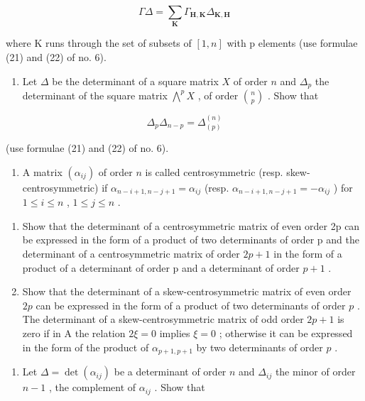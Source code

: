 \[
\Gamma \Delta = \sum_ {\mathbf {K}} \Gamma_ {\mathbf {H}, \mathbf {K}} \Delta_ {\mathbf {K}, \mathbf {H}}
\]

where K runs through the set of subsets of \([1, n]\) with p elements (use formulae (21) and (22) of no. 6).

\begin{enumerate}
\def\labelenumi{\arabic{enumi}.}
\setcounter{enumi}{10}
\tightlist
\item
  Let \(\Delta\) be the determinant of a square matrix \(X\) of order \(n\) and \(\Delta_p\) the determinant of the square matrix \(\bigwedge^p X\) , of order \(\binom{n}{p}\) . Show that
\end{enumerate}

\[
\Delta_ {p} \Delta_ {n - p} = \Delta_ {(p)} ^ {(n)}
\]

(use formulae (21) and (22) of no. 6).

\begin{enumerate}
\def\labelenumi{\arabic{enumi}.}
\setcounter{enumi}{11}
\tightlist
\item
  A matrix \((\alpha_{ij})\) of order \(n\) is called centrosymmetric (resp. skew-centrosymmetric) if \(\alpha_{n - i + 1, n - j + 1} = \alpha_{ij}\) (resp. \(\alpha_{n - i + 1, n - j + 1} = -\alpha_{ij}\) ) for \(1 \leqslant i \leqslant n\) , \(1 \leqslant j \leqslant n\) .
\end{enumerate}

\begin{enumerate}
\def\labelenumi{(\alph{enumi})}
\item
  Show that the determinant of a centrosymmetric matrix of even order 2p can be expressed in the form of a product of two determinants of order p and the determinant of a centrosymmetric matrix of order \(2p + 1\) in the form of a product of a determinant of order p and a determinant of order \(p + 1\) .
\item
  Show that the determinant of a skew-centrosymmetric matrix of even order \(2p\) can be expressed in the form of a product of two determinants of order \(p\) . The determinant of a skew-centrosymmetric matrix of odd order \(2p + 1\) is zero if in A the relation \(2\xi = 0\) implies \(\xi = 0\) ; otherwise it can be expressed in the form of the product of \(\alpha_{p+1,p+1}\) by two determinants of order \(p\) .
\end{enumerate}

\begin{enumerate}
\def\labelenumi{\arabic{enumi}.}
\setcounter{enumi}{12}
\tightlist
\item
  Let \(\Delta = \det(\alpha_{ij})\) be a determinant of order \(n\) and \(\Delta_{ij}\) the minor of order \(n - 1\) , the complement of \(\alpha_{ij}\) . Show that
\end{enumerate}

